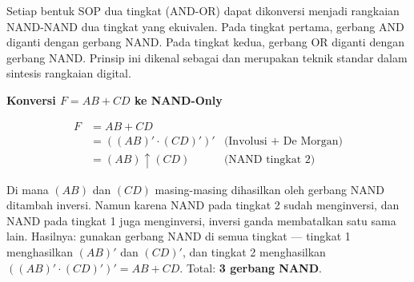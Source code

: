\begin{konsep}
Setiap bentuk SOP dua tingkat (AND-OR) dapat dikonversi menjadi rangkaian NAND-NAND dua tingkat yang ekuivalen. Pada tingkat pertama, gerbang AND diganti dengan gerbang NAND. Pada tingkat kedua, gerbang OR diganti dengan gerbang NAND. Prinsip ini dikenal sebagai  dan merupakan teknik standar dalam sintesis rangkaian digital.
\end{konsep}

\begin{contoh}
\textbf{Konversi $F = AB + CD$ ke NAND-Only}

\begin{align*}
F &= AB + CD \\
  &= ((AB)' \cdot (CD)' )' & \text{(Involusi + De Morgan)} \\
  &= (AB) \uparrow (CD) & \text{(NAND tingkat 2)}
\end{align*}

Di mana $(AB)$ dan $(CD)$ masing-masing dihasilkan oleh gerbang NAND ditambah inversi. Namun karena NAND pada tingkat 2 sudah menginversi, dan NAND pada tingkat 1 juga menginversi, inversi ganda membatalkan satu sama lain. Hasilnya: gunakan gerbang NAND di semua tingkat --- tingkat 1 menghasilkan $(AB)'$ dan $(CD)'$, dan tingkat 2 menghasilkan $((AB)' \cdot (CD)')' = AB + CD$. Total: \textbf{3 gerbang NAND}.
\end{contoh}
